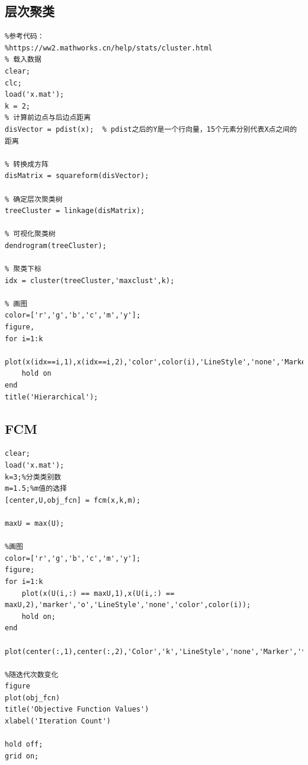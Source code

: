 \documentclass{article}
\begin{document}
\subsection*{层次聚类}
\lstset{language=Matlab}
\lstset{breaklines}%
\begin{lstlisting}
%参考代码：
%https://ww2.mathworks.cn/help/stats/cluster.html
% 载入数据
clear;
clc;
load('x.mat');
k = 2; 
% 计算前边点与后边点距离
disVector = pdist(x);  % pdist之后的Y是一个行向量，15个元素分别代表X点之间的距离
 
% 转换成方阵
disMatrix = squareform(disVector);
 
% 确定层次聚类树 
treeCluster = linkage(disMatrix);
 
% 可视化聚类树
dendrogram(treeCluster);
 
% 聚类下标
idx = cluster(treeCluster,'maxclust',k); 
 
% 画图
color=['r','g','b','c','m','y'];
figure,
for i=1:k
    plot(x(idx==i,1),x(idx==i,2),'color',color(i),'LineStyle','none','Marker','o')
    hold on
end
title('Hierarchical'); 

\end{lstlisting}

\subsection*{FCM}
\lstset{language=Matlab}
\lstset{breaklines}%
\begin{lstlisting}
clear;
load('x.mat');
k=3;%分类类别数
m=1.5;%m值的选择
[center,U,obj_fcn] = fcm(x,k,m);

maxU = max(U); 

%画图
color=['r','g','b','c','m','y']; 
figure;
for i=1:k
    plot(x(U(i,:) == maxU,1),x(U(i,:) == maxU,2),'marker','o','LineStyle','none','color',color(i));
    hold on;
end

plot(center(:,1),center(:,2),'Color','k','LineStyle','none','Marker','*')

%随迭代次数变化
figure
plot(obj_fcn)
title('Objective Function Values')   
xlabel('Iteration Count')

hold off;
grid on;


\end{lstlisting}
\newpage
 
\end{document}
